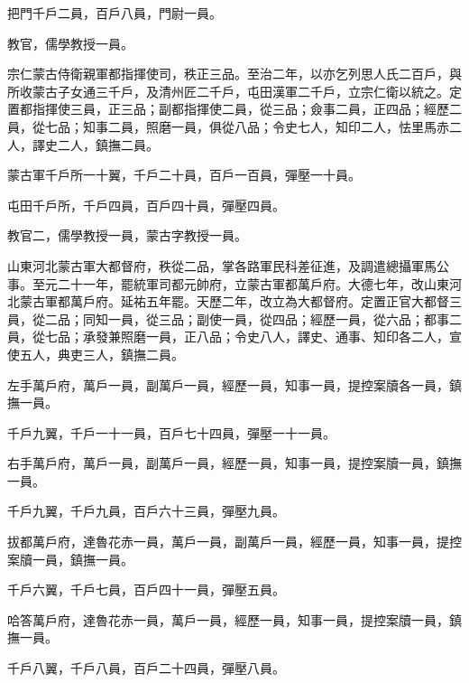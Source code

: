 \begin{pinyinscope}
 把門千戶二員，百戶八員，門尉一員。



 教官，儒學教授一員。



 宗仁蒙古侍衛親軍都指揮使司，秩正三品。至治二年，以亦乞列思人氏二百戶，與所收蒙古子女通三千戶，及清州匠二千戶，屯田漢軍二千戶，立宗仁衛以統之。定置都指揮使三員，正三品；副都指揮使二員，從三品；僉事二員，正四品；經歷二員，從七品；知事二員，照磨一員，俱從八品；令史七人，知印二人，怯里馬赤二人，譯史二人，鎮撫二員。



 蒙古軍千戶所一十翼，千戶二十員，百戶一百員，彈壓一十員。



 屯田千戶所，千戶四員，百戶四十員，彈壓四員。



 教官二，儒學教授一員，蒙古字教授一員。



 山東河北蒙古軍大都督府，秩從二品，掌各路軍民科差征進，及調遣總攝軍馬公事。至元二十一年，罷統軍司都元帥府，立蒙古軍都萬戶府。大德七年，改山東河北蒙古軍都萬戶府。延祐五年罷。天歷二年，改立為大都督府。定置正官大都督三員，從二品；同知一員，從三品；副使一員，從四品；經歷一員，從六品；都事二員，從七品；承發兼照磨一員，正八品；令史八人，譯史、通事、知印各二人，宣使五人，典吏三人，鎮撫二員。



 左手萬戶府，萬戶一員，副萬戶一員，經歷一員，知事一員，提控案牘各一員，鎮撫一員。



 千戶九翼，千戶一十一員，百戶七十四員，彈壓一十一員。



 右手萬戶府，萬戶一員，副萬戶一員，經歷一員，知事一員，提控案牘一員，鎮撫一員。



 千戶九翼，千戶九員，百戶六十三員，彈壓九員。



 拔都萬戶府，達魯花赤一員，萬戶一員，副萬戶一員，經歷一員，知事一員，提控案牘一員，鎮撫一員。



 千戶六翼，千戶七員，百戶四十一員，彈壓五員。



 哈答萬戶府，達魯花赤一員，萬戶一員，經歷一員，知事一員，提控案牘一員，鎮撫一員。



 千戶八翼，千戶八員，百戶二十四員，彈壓八員。




\end{pinyinscope}
